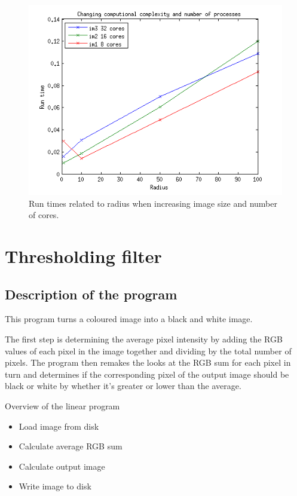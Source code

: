 \documentclass[a4paper,11pt]{article}
\begin{document}
\begin{figure}[!h]
  \caption{Run times related to radius when increasing image size and number of cores.}
  \label{complexity}
  \includegraphics[scale=0.9]{../plots/compexity_and_no_processes.png}
\end{figure}
\newpage

\section{Thresholding filter}
\subsection{Description of the program}
This program turns a coloured image into a black and white image. 

The first step is determining the average pixel intensity by adding the RGB values of each pixel in the image together and dividing by the total number of pixels. The program then remakes the looks at the RGB sum for each pixel in turn and determines if the corresponding pixel of the output image should be black or white by whether it's greater or lower than the average.

Overview of the linear program

\begin{itemize}
\renewcommand{\labelitemi}{$\bullet$}
\item Load image from disk
\item Calculate average RGB sum
\item Calculate output image
\item Write image to disk
\end{itemize}
\end{document}
